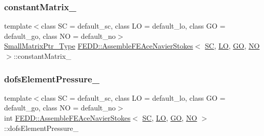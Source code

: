 \subsubsection{\texorpdfstring{constant\+Matrix\+\_\+}{constantMatrix\_}}
{\footnotesize\ttfamily template$<$class SC  = default\+\_\+sc, class LO  = default\+\_\+lo, class GO  = default\+\_\+go, class NO  = default\+\_\+no$>$ \\
\hyperlink{classFEDD_1_1AssembleFE_afb5fb5dca3aab59f697a25884e99e894}{Small\+Matrix\+Ptr\+\_\+\+Type} \hyperlink{classFEDD_1_1AssembleFEAceNavierStokes}{F\+E\+D\+D\+::\+Assemble\+F\+E\+Ace\+Navier\+Stokes}$<$ \hyperlink{fe__test__laplace_8cpp_a79c7e86a57edbb2a5a53242bcd04e41e}{SC}, \hyperlink{fe__test__laplace_8cpp_ad6a38c9f07d3fd633eefca5bccad8410}{LO}, \hyperlink{fe__test__laplace_8cpp_afa2946b509009b4f45eb04bd8c5b27d9}{GO}, \hyperlink{fe__test__laplace_8cpp_a5e24f37b28787429872b6ecb1d0417ce}{NO} $>$\+::constant\+Matrix\+\_\+\hspace{0.3cm}{\ttfamily [private]}}

\mbox{\label{classFEDD_1_1AssembleFEAceNavierStokes_a72e23e465ceb18a0dfcd32d42b55aa82}} 
\subsubsection{\texorpdfstring{dofs\+Element\+Pressure\+\_\+}{dofsElementPressure\_}}
{\footnotesize\ttfamily template$<$class SC  = default\+\_\+sc, class LO  = default\+\_\+lo, class GO  = default\+\_\+go, class NO  = default\+\_\+no$>$ \\
int \hyperlink{classFEDD_1_1AssembleFEAceNavierStokes}{F\+E\+D\+D\+::\+Assemble\+F\+E\+Ace\+Navier\+Stokes}$<$ \hyperlink{fe__test__laplace_8cpp_a79c7e86a57edbb2a5a53242bcd04e41e}{SC}, \hyperlink{fe__test__laplace_8cpp_ad6a38c9f07d3fd633eefca5bccad8410}{LO}, \hyperlink{fe__test__laplace_8cpp_afa2946b509009b4f45eb04bd8c5b27d9}{GO}, \hyperlink{fe__test__laplace_8cpp_a5e24f37b28787429872b6ecb1d0417ce}{NO} $>$\+::dofs\+Element\+Pressure\+\_\+\hspace{0.3cm}{\ttfamily [private]}}

